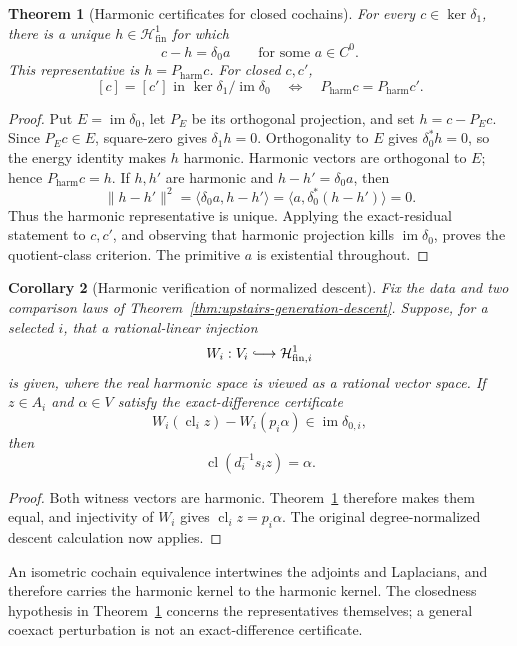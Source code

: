 \documentclass[11pt]{article}
\newtheorem{theorem}{Theorem}[section]
\newtheorem{corollary}[theorem]{Corollary}
\theoremstyle{definition}
\theoremstyle{remark}
\begin{document}
\begin{theorem}[Harmonic certificates for closed cochains]
\label{thm:finite-harmonic-certificates}
For every \(c\in\ker\delta_1\), there is a unique
\(h\in\mathcal H^1_{\mathrm{fin}}\) for which
\[
 c-h=\delta_0a\qquad\text{for some }a\in C^0.
\]
This representative is \(h=P_{\mathrm{harm}}c\). For closed \(c,c'\),
\[
 [c]=[c']\text{ in }\ker\delta_1/\operatorname{im}\delta_0
 \quad\Longleftrightarrow\quad
 P_{\mathrm{harm}}c=P_{\mathrm{harm}}c'.
\]
\end{theorem}
\begin{proof}
Put \(E=\operatorname{im}\delta_0\), let \(P_E\) be its orthogonal
projection, and set \(h=c-P_Ec\). Since \(P_Ec\in E\), square-zero gives
\(\delta_1h=0\). Orthogonality to \(E\) gives \(\delta_0^*h=0\), so the
energy identity makes \(h\) harmonic. Harmonic vectors are orthogonal to
\(E\); hence \(P_{\mathrm{harm}}c=h\).
If \(h,h'\) are harmonic and \(h-h'=\delta_0a\), then
\[
 \|h-h'\|^2
 =\langle\delta_0a,h-h'\rangle
 =\langle a,\delta_0^*(h-h')\rangle=0.
\]
Thus the harmonic representative is unique. Applying the exact-residual
statement to \(c,c'\), and observing that harmonic projection kills
\(\operatorname{im}\delta_0\), proves the quotient-class criterion.
The primitive \(a\) is existential throughout.
\end{proof}

\begin{corollary}[Harmonic verification of normalized descent]
\label{cor:harmonic-normalized-descent}
Fix the data and two comparison laws of
Theorem~\ref{thm:upstairs-generation-descent}. Suppose, for a selected \(i\),
that a rational-linear injection
\[
 W_i:V_i\lhook\joinrel\longrightarrow\mathcal H^1_{\mathrm{fin},i}
\]
is given, where the real harmonic space is viewed as a rational vector
space. If \(z\in A_i\) and \(\alpha\in V\) satisfy the exact-difference
certificate
\[
 W_i(\operatorname{cl}_i z)-W_i(p_i\alpha)
       \in\operatorname{im}\delta_{0,i},
\]
then
\[
 \operatorname{cl}\left(d_i^{-1}s_i z\right)=\alpha.
\]
\end{corollary}
\begin{proof}
Both witness vectors are harmonic. Theorem~\ref{thm:finite-harmonic-certificates}
therefore makes them equal, and injectivity of \(W_i\) gives
\(\operatorname{cl}_i z=p_i\alpha\). The original degree-normalized descent
calculation now applies.
\end{proof}

An isometric cochain equivalence intertwines the adjoints and Laplacians,
and therefore carries the harmonic kernel to the harmonic kernel. The
closedness hypothesis in Theorem~\ref{thm:finite-harmonic-certificates}
concerns the representatives themselves; a general coexact perturbation is
not an exact-difference certificate.
\end{document}
